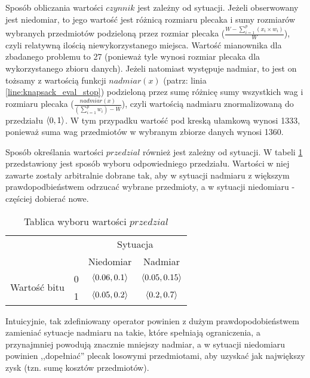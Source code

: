 \documentclass[./FM_mgr.tex]{subfiles}
\begin{document}
	Sposób obliczania wartości $czynnik$ jest zależny od sytuacji. 
	Jeżeli obserwowany jest niedomiar, to jego wartość jest różnicą rozmiaru plecaka i sumy rozmiarów wybranych przedmiotów podzieloną przez rozmiar plecaka ($\frac{W - \sum_{i=1}^p (x_i \times w_i)}{W}$), czyli relatywną ilością niewykorzystanego miejsca. Wartość mianownika dla zbadanego problemu to 27 (ponieważ tyle wynosi rozmiar plecaka dla wykorzystanego zbioru danych).
	Jeżeli natomiast występuje nadmiar, to jest on tożsamy z wartością funkcji $nadmiar(x)$ (patrz: linia \ref{line:knapsack_eval_stop}) podzieloną przez sumę różnicę sumy wszystkich wag i rozmiaru plecaka ($\frac{nadmiar(x)}{(\sum_{i=1}^p w_i) - W}$), czyli wartością nadmiaru znormalizowaną do przedziału $\langle0, 1\rangle$.
	W tym przypadku wartość pod kreską ułamkową wynosi 1333, ponieważ suma wag przedmiotów w wybranym zbiorze danych wynosi 1360.
	
	Sposób określania wartości $przedzial$ również jest zależny od sytuacji. 
	W tabeli \ref{table:range_choose} przedstawiony jest sposób wyboru odpowiedniego przedziału. 
	Wartości w niej zawarte zostały arbitralnie dobrane tak, aby w sytuacji nadmiaru z większym prawdopodbieństwem odrzucać wybrane przedmioty, a w sytuacji niedomiaru - częściej dobierać nowe.
	
	\begin{table}
		\caption{Tablica wyboru wartości $przedzial$ \label{table:range_choose}}
		\centering
		\begin{tabular}{cc|c|c|}
			\cline{3-4}
			\multicolumn{2}{c|}{\multirow{2}{*}{}}                   & \multicolumn{2}{c|}{Sytuacja}              \\ \cline{3-4} 
			\multicolumn{2}{c|}{}                                    & Niedomiar           & Nadmiar              \\ \hline
			\multicolumn{1}{|c|}{\multirow{2}{*}{Wartość bitu}} & 0 & $\langle0.06, 0.1\rangle$ & $\langle0.05, 0.15\rangle$ \\ \cline{2-4} 
			\multicolumn{1}{|c|}{}                              & 1 & $\langle0.05, 0.2\rangle$ & $\langle0.2, 0.7\rangle$   \\ \hline
		\end{tabular}
	\end{table}
	
	Intuicyjnie, tak zdefiniowany operator powinien z dużym prawdopodobieństwem zamieniać sytuacje nadmiaru na takie, które spełniają ograniczenia, a przynajmniej powodują znacznie mniejszy nadmiar, a w sytuacji niedomiaru powinien ,,dopełniać'' plecak losowymi przedmiotami, aby uzyskać jak największy zysk (tzn. sumę kosztów przedmiotów).
	
\end{document}
